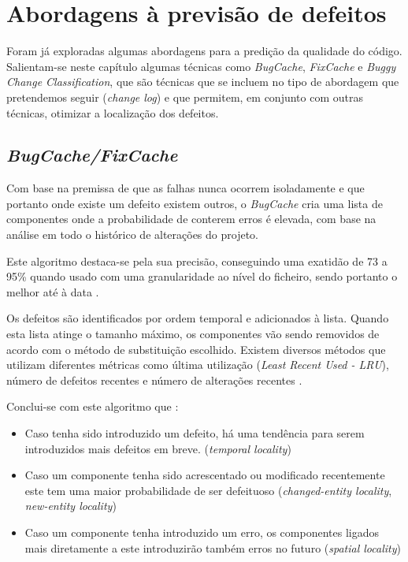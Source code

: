 \section{Abordagens à previsão de defeitos}

Foram já exploradas algumas abordagens para a predição da qualidade do código. Salientam-se neste capítulo algumas técnicas como \emph{BugCache}, \emph{FixCache} e \emph{Buggy Change Classification}, que são técnicas que se incluem no tipo de abordagem que pretendemos seguir (\emph{change log}) e que permitem, em conjunto com outras técnicas, otimizar a localização dos defeitos.

\subsection{\emph{BugCache/FixCache}}

Com base na premissa de que as falhas nunca ocorrem isoladamente e que portanto onde existe um defeito existem outros, o \emph{BugCache} cria uma lista de componentes onde a probabilidade de conterem erros é elevada, com base na análise em todo o histórico de alterações do projeto.

Este algoritmo destaca-se pela sua precisão, conseguindo uma exatidão de 73 a 95\% quando usado com uma granularidade ao nível do ficheiro, sendo portanto o melhor até à data \cite{Kim2006}.

Os defeitos são identificados por ordem temporal e adicionados à lista. Quando esta lista atinge o tamanho máximo, os componentes vão sendo removidos de acordo com o método de substituição escolhido. Existem diversos métodos que utilizam diferentes métricas como última utilização (\emph{Least Recent Used - LRU}), número de defeitos recentes e número de alterações recentes \cite{Kim2006}.

Conclui-se com este algoritmo que \cite{Kim2006}:
%
\begin{itemize}
	\item Caso tenha sido introduzido um defeito, há uma tendência para serem introduzidos mais defeitos em breve. (\emph{temporal locality})
	\item Caso um componente tenha sido acrescentado ou modificado recentemente este tem uma maior probabilidade de ser defeituoso (\emph{changed-entity locality}, \emph{new-entity locality})
	\item Caso um componente tenha introduzido um erro, os componentes ligados mais diretamente a este introduzirão também erros no futuro (\emph{spatial locality})
\end{itemize}

